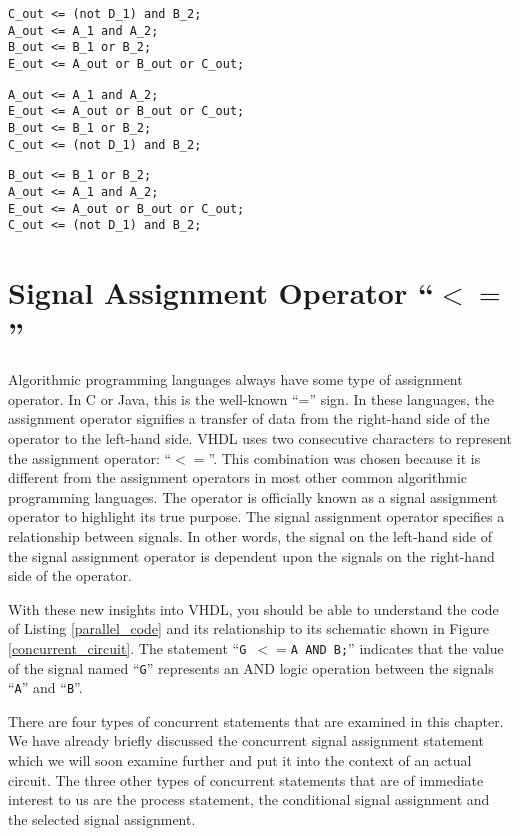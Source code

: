 \begin{lstlisting}[label=parallel_code_2, caption=Equivalent VHDL code for the circuit of Figure 4.1. ]
C_out <= (not D_1) and B_2; 
A_out <= A_1 and A_2;   
B_out <= B_1 or B_2; 
E_out <= A_out or B_out or C_out;
\end{lstlisting}
\begin{lstlisting}[label=parallel_code_3, caption=Equivalent VHDL code for the circuit of Figure 4.1.]
A_out <= A_1 and A_2;   
E_out <= A_out or B_out or C_out;
B_out <= B_1 or B_2; 
C_out <= (not D_1) and B_2; 
\end{lstlisting}
\begin{lstlisting}[label=parallel_code_4, caption=Equivalent VHDL code for the circuit of Figure 4.1.]
B_out <= B_1 or B_2; 
A_out <= A_1 and A_2;   
E_out <= A_out or B_out or C_out;
C_out <= (not D_1) and B_2; 
\end{lstlisting}

\section{Signal Assignment Operator ``$<=$''}
Algorithmic programming languages always have some type of assignment operator. In C or Java, this is the well-known ``='' sign. In these languages, the assignment operator signifies a transfer of data from the right-hand side of the operator to the left-hand side. VHDL uses two consecutive characters to represent the assignment operator: ``$<=$''. This combination was chosen because it is different from the assignment operators in most other common algorithmic programming languages. The operator is officially known as a signal assignment operator to highlight its true purpose. The signal assignment operator specifies a relationship between signals. In other words, the signal on the left-hand side of the signal assignment operator is dependent upon the signals on the right-hand side of the operator.

With these new insights into VHDL, you should be able to understand the code of Listing \ref{parallel_code} and its relationship to its schematic shown in Figure \ref{concurrent_circuit}. The statement ``\texttt{\footnotesize G~$<=$A~AND~B;}'' indicates that the value of the signal named ``\texttt{\footnotesize G}'' represents an AND logic operation between the signals ``\texttt{\footnotesize A}'' and ``\texttt{\footnotesize B}''.

There are four types of concurrent statements that are examined in this chapter. We have already briefly discussed the concurrent signal assignment statement which we will soon examine further and put it into the context of an actual circuit. The three other types of concurrent statements that are of immediate interest to us are the process statement, the conditional signal assignment and the selected signal assignment.

